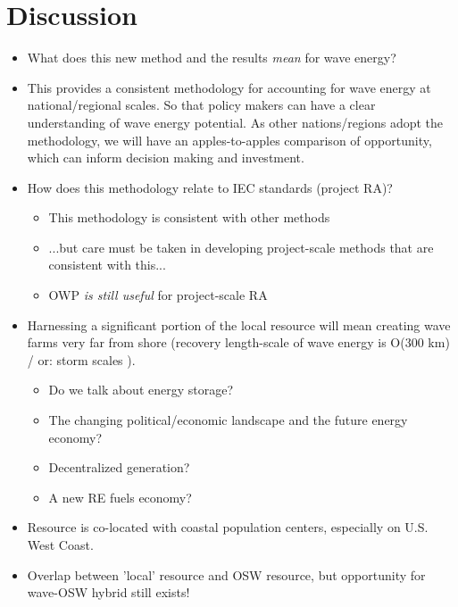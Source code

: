 
\section{Discussion} \label{sec:discussion}


\begin{itemize}
\item What does this new method and the results {\it mean} for wave energy?
\item This provides a consistent methodology for accounting for wave energy at national/regional scales. So that policy makers can have a clear understanding of wave energy potential. As other nations/regions adopt the methodology, we will have an apples-to-apples comparison of opportunity, which can inform decision making and investment.
\item How does this methodology relate to IEC standards (project RA)?
  \begin{itemize}
  \item This methodology is consistent with other methods
  \item ...but care must be taken in developing project-scale methods that are consistent with this...
  \item OWP {\it is still useful} for project-scale RA
  \end{itemize}
\item Harnessing a significant portion of the local resource will mean creating wave farms very far from shore (recovery length-scale of wave energy is O(300 km) / or: storm scales ).
  \begin{itemize}
  \item Do we talk about energy storage?
  \item The changing political/economic landscape and the future energy economy?
  \item Decentralized generation?
  \item A new RE fuels economy?
  \end{itemize}
\item Resource is co-located with coastal population centers, especially on U.S. West Coast.
\item Overlap between 'local' resource and OSW resource, but opportunity for wave-OSW hybrid still exists!
\end{itemize}

